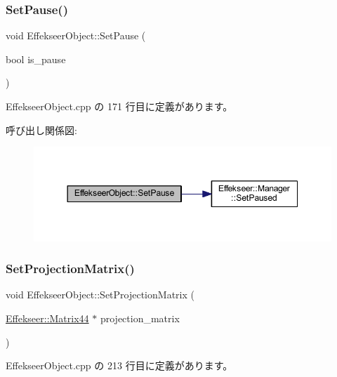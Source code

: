 \subsubsection{\texorpdfstring{Set\+Pause()}{SetPause()}}
{\footnotesize\ttfamily void Effekseer\+Object\+::\+Set\+Pause (\begin{DoxyParamCaption}\item[{bool}]{is\+\_\+pause }\end{DoxyParamCaption})}



 Effekseer\+Object.\+cpp の 171 行目に定義があります。

呼び出し関係図\+:\nopagebreak
\begin{figure}[H]
\begin{center}
\leavevmode
\includegraphics[width=350pt]{class_effekseer_object_aeec933c68ceb4bafc69d65590c470d72_cgraph}
\end{center}
\end{figure}
\mbox{\label{class_effekseer_object_aa3849f176ccb493b162d08c1ef387996}} 
\subsubsection{\texorpdfstring{Set\+Projection\+Matrix()}{SetProjectionMatrix()}}
{\footnotesize\ttfamily void Effekseer\+Object\+::\+Set\+Projection\+Matrix (\begin{DoxyParamCaption}\item[{\mbox{\hyperlink{struct_effekseer_1_1_matrix44}{Effekseer\+::\+Matrix44}} $\ast$}]{projection\+\_\+matrix }\end{DoxyParamCaption})}



 Effekseer\+Object.\+cpp の 213 行目に定義があります。

